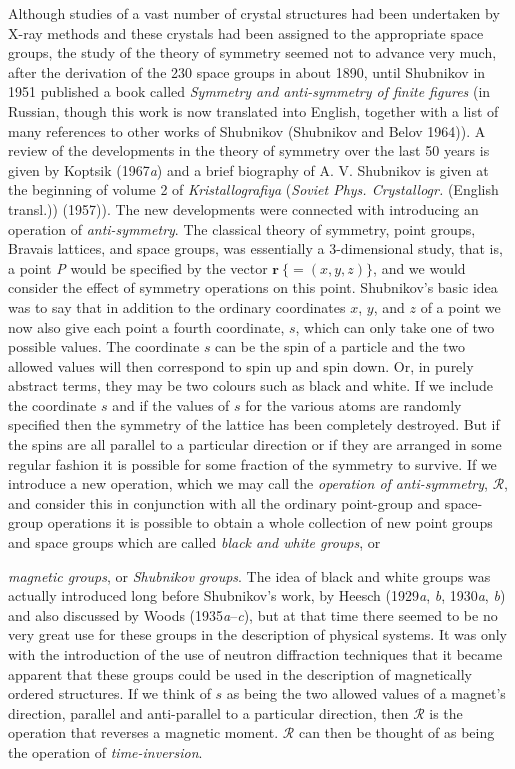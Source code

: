 \documentclass[11pt,a4paper,twoside,openright]{book}
\begin{document}
Although studies of a vast number of crystal structures had been undertaken by X-ray methods and these crystals had been assigned to the appropriate space groups, the study of the theory of symmetry seemed not to advance very much, after the derivation of the 230 space groups in about 1890, until Shubnikov in 1951 published a book called \textit{Symmetry and anti-symmetry of finite figures} (in Russian, though this work is now translated into English, together with a list of many references to other works of Shubnikov (Shubnikov and Belov 1964)). A review of the developments in the theory of symmetry over the last 50 years is given by Koptsik (1967\textit{a}) and a brief biography of A. V. Shubnikov is given at the beginning of volume 2 of \textit{Kristallografiya} (\textit{Soviet Phys. Crystallogr.} (English transl.)) (1957)). The new developments were connected with introducing an operation of \textit{anti-symmetry}. The classical theory of symmetry, point groups, Bravais lattices, and space groups, was essentially a 3-dimensional study, that is, a point \textit{P} would be specified by the vector $\mathbf{r}\ \{=(x, y, z)\}$, and we would consider the effect of symmetry operations on this point. Shubnikov's basic idea was to say that in addition to the ordinary coordinates $x$, $y$, and $z$ of a point we now also give each point a fourth coordinate, $s$, which can only take one of two possible values. The coordinate $s$ can be the spin of a particle and the two allowed values will then correspond to spin up and spin down. Or, in purely abstract terms, they may be two colours such as black and white. If we include the coordinate $s$ and if the values of $s$ for the various atoms are randomly specified then the symmetry of the lattice has been completely destroyed. But if the spins are all parallel to a particular direction or if they are arranged in some regular fashion it is possible for some fraction of the symmetry to survive. If we introduce a new operation, which we may call the \textit{operation of anti-symmetry}, $\mathcal{R}$, and consider this in conjunction with all the ordinary point-group and space-group operations it is possible to obtain a whole collection of new point groups and space groups which are called \textit{black and white groups}, or

\textit{magnetic groups}, or \textit{Shubnikov groups}. The idea of black and white groups was actually introduced long before Shubnikov's work, by Heesch (1929\textit{a}, \textit{b}, 1930\textit{a}, \textit{b}) and also discussed by Woods (1935\textit{a}–\textit{c}), but at that time there seemed to be no very great use for these groups in the description of physical systems. It was only with the introduction of the use of neutron diffraction techniques that it became apparent that these groups could be used in the description of magnetically ordered structures. If we think of $s$ as being the two allowed values of a magnet's direction, parallel and anti-parallel to a particular direction, then $\mathcal{R}$ is the operation that reverses a magnetic moment. $\mathcal{R}$ can then be thought of as being the operation of \textit{time-inversion}.
\end{document}
